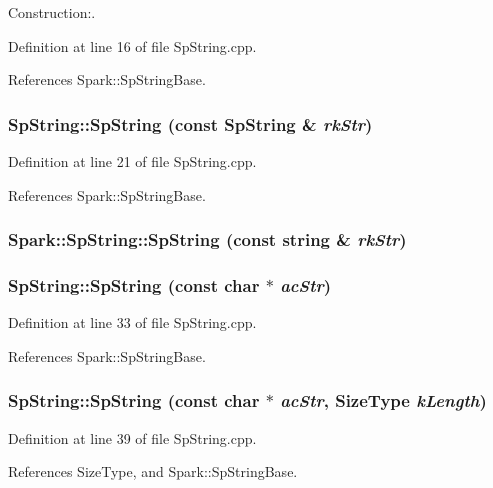 Construction:. 

Definition at line 16 of file Sp\-String.cpp.

References Spark::Sp\-String\-Base.
\subsubsection{\setlength{\rightskip}{0pt plus 5cm}Sp\-String::Sp\-String (const {\bf Sp\-String} \& {\em rk\-Str})}\label{classSpark_1_1SpString_a1}


Definition at line 21 of file Sp\-String.cpp.

References Spark::Sp\-String\-Base.
\subsubsection{\setlength{\rightskip}{0pt plus 5cm}Spark::Sp\-String::Sp\-String (const string \& {\em rk\-Str})}\label{classSpark_1_1SpString_a2}


\subsubsection{\setlength{\rightskip}{0pt plus 5cm}Sp\-String::Sp\-String (const char $\ast$ {\em ac\-Str})}\label{classSpark_1_1SpString_a3}


Definition at line 33 of file Sp\-String.cpp.

References Spark::Sp\-String\-Base.
\subsubsection{\setlength{\rightskip}{0pt plus 5cm}Sp\-String::Sp\-String (const char $\ast$ {\em ac\-Str}, {\bf Size\-Type} {\em k\-Length})}\label{classSpark_1_1SpString_a4}


Definition at line 39 of file Sp\-String.cpp.

References Size\-Type, and Spark::Sp\-String\-Base.
